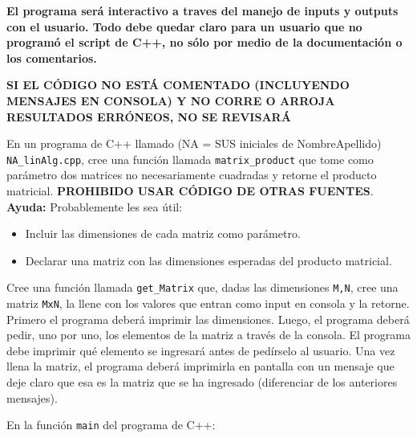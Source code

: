 \documentclass[11pt,letterpaper]{exam}
\begin{document}
\vspace{0.3cm}

\begin{questions}



\textbf{El programa ser\'a interactivo a traves del manejo de inputs y outputs con el usuario. Todo debe quedar claro para un usuario que no program\'o el script de C++, no s\'olo por medio de la documentaci\'on o los comentarios.}

\textbf{SI EL C\'ODIGO NO EST\'A COMENTADO (INCLUYENDO MENSAJES EN CONSOLA) Y NO CORRE O ARROJA RESULTADOS ERR\'ONEOS, NO SE REVISAR\'A}




En un programa de C++ llamado (NA = SUS iniciales de NombreApellido) \verb"NA_linAlg.cpp", cree una funci\'on llamada \verb"matrix_product" que tome como par\'ametro dos matrices no necesariamente cuadradas y retorne el producto matricial. \textbf{PROHIBIDO USAR C\'ODIGO DE OTRAS FUENTES}.\\

\textbf{Ayuda:} Probablemente les sea \'util:

\begin{itemize}
\item Incluir las dimensiones de cada matriz como par\'ametro.
\item Declarar una matriz con las dimensiones esperadas del producto matricial.   
\end{itemize}


Cree una funci\'on llamada \verb"get_Matrix" que, dadas las dimensiones \verb"M,N", cree una matriz \verb"MxN", la llene con los valores que entran como input en consola y la retorne. Primero el programa deber\'a imprimir las dimensiones. Luego, el programa deber\'a pedir, uno por uno, los elementos de la matriz a trav\'es de la consola. El programa debe imprimir qu\'e elemento se ingresar\'a antes de ped\'irselo al usuario. Una vez llena la matriz, el programa deber\'a imprimirla en pantalla con un mensaje que deje claro que esa es la matriz que se ha ingresado (diferenciar de los anteriores mensajes).\\



En la funci\'on \verb"main" del programa de C++:


\end{questions}
\end{document}
